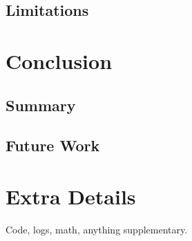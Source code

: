 \documentclass[11pt,a4paper]{report}
\begin{document}
\section{Limitations}

\chapter{Conclusion}
\section{Summary}
\section{Future Work}




\appendix
\chapter{Extra Details}
Code, logs, math, anything supplementary.
\end{document}
